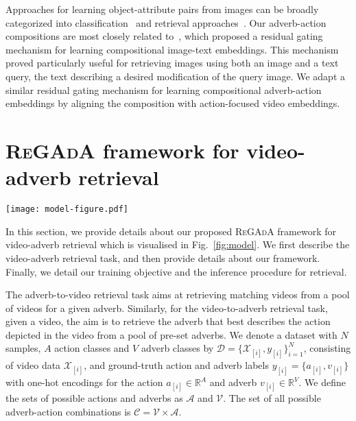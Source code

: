 \documentclass[table]{bmvc2k}
\newcommand{\modelName}{\textsc{ReGAdA}\xspace}
\begin{document}
Approaches for learning object-attribute pairs from images can be broadly categorized into classification~\cite{misra2017red, nagarajan2018attributes, li2020symmetry, mancini2021_compcos, naeem2021_cge} and retrieval approaches~\cite{borth2013large,chen2014inferring,isola2015discovering,nan2019recognizing,wang2013unified,wang2010discriminative,vo2019composing}.
Our adverb-action compositions are most closely related to~\cite{vo2019composing}, which proposed a residual gating mechanism for learning compositional image-text embeddings. This mechanism proved particularly useful for retrieving images using both an image and a text query, the text describing a desired modification of the query image. We adapt a similar residual gating mechanism for learning compositional adverb-action embeddings by aligning the composition with action-focused video embeddings.  

\section{\modelName framework for video-adverb retrieval}
\begin{figure*}
    \begin{center}
    \texttt{[image: model-figure.pdf]} 
    \end{center}
    \caption{\textbf{Overview of our \modelName framework for video-adverb retrieval.} Our framework composes adverb-action embeddings with a gated residual between the adverbs $\phi_v$ and the concatenated action and adverb embeddings $[\phi_a,\phi_v]$. The training objective $\mathcal{L}$ aligns the learned text and video representations in a joint embedding space. For test time inference, outputs are obtained based on similarity in the embedding space. 
}
    \label{fig:model}
 \vspace{-10pt}
\end{figure*}


In this section, we provide details about our proposed \modelName framework for video-adverb retrieval which is visualised in Fig.~\ref{fig:model}. We first 
describe the video-adverb retrieval task, and then provide details about our framework. Finally, we detail our training objective and the inference procedure for retrieval.

The adverb-to-video retrieval task aims at retrieving matching videos from a pool of videos for a given adverb. Similarly, for the video-to-adverb retrieval task, given a video, the aim is to retrieve the adverb that best describes the action depicted in the video from a pool of pre-set adverbs. 
We denote a dataset with $N$ samples, $A$ action classes and $V$ adverb classes by $\mathcal{D} = \{\mathcal{X}_{[i]}, y_{[i]}\}_{i=1}^{N}$, consisting of video data $\mathcal{X}_{[i]}$, and ground-truth action and adverb labels $y_{[i]} = \{a_{[i]}, v_{[i]}\}$ with one-hot encodings for the action $a_{[i]} \in \mathbb{R}^{{A}}$ and adverb $v_{[i]} \in \mathbb{R}^{{V}}$.
We define the sets of possible actions and adverbs as $\mathcal{A}$ and $\mathcal{V}$. The set of all possible adverb-action combinations is 
$\mathcal{C} = \mathcal{V} \times \mathcal{A}$.
\end{document}
